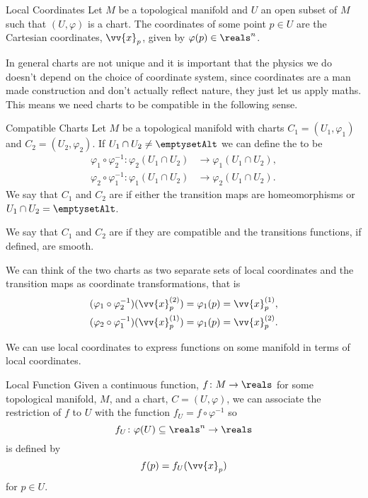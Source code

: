 \begin{dfn}{Local Coordinates}{}
    Let \(M\) be a topological manifold and \(U\) an open subset of \(M\) such that \((U, \varphi)\) is a chart.
    The coordinates of some point \(p \in U\) are the Cartesian coordinates, \(\vv{x}_p\), given by \(\varphi(p) \in \reals^n\).
\end{dfn}

In general charts are not unique and it is important that the physics we do doesn't depend on the choice of coordinate system, since coordinates are a man made construction and don't actually reflect nature, they just let us apply maths.
This means we need charts to be compatible in the following sense.

\begin{dfn}{Compatible Charts}{}
    Let \(M\) be a topological manifold with charts \(C_1 = (U_1, \varphi_1)\) and \(C_2 = (U_2, \varphi_2)\).
    If \(U_1 \cap U_2 \ne \emptysetAlt\) we can define the  to be
    \begin{align}
        \varphi_1 \circ \varphi_2^{-1} \colon \varphi_2(U_1 \cap U_2) &\to \varphi_1(U_1 \cap U_2),\\
        \varphi_2 \circ \varphi_1^{-1} \colon \varphi_1(U_1 \cap U_2) &\to \varphi_2(U_1 \cap U_2).
    \end{align}
    We say that \(C_1\) and \(C_2\) are  if either the transition maps are homeomorphisms or \(U_1 \cap U_2 = \emptysetAlt\).
    
    We say that \(C_1\) and \(C_2\) are  if they are compatible and the transitions functions, if defined, are smooth.
\end{dfn}

We can think of the two charts as two separate sets of local coordinates and the transition maps as coordinate transformations, that is
\begin{align}
    (\varphi_1 \circ \varphi_2^{-1})(\vv{x}_p^{(2)}) &= \varphi_1(p) = \vv{x}_p^{(1)},\\
    (\varphi_2 \circ \varphi_1^{-1})(\vv{x}_p^{(1)}) &= \varphi_1(p) = \vv{x}_p^{(2)}.
\end{align}

We can use local coordinates to express functions on some manifold in terms of local coordinates.

\begin{dfn}{Local Function}{}
    Given a continuous function, \(f \colon M \to \reals\) for some topological manifold, \(M\), and a chart, \(C = (U, \varphi)\), we can associate the restriction of \(f\) to \(U\) with the function \(f_U = f \circ \varphi^{-1}\) so
    \begin{equation}
        f_U \colon \varphi(U) \subseteq \reals^n \to \reals
    \end{equation}
    is defined by
    \begin{equation}
        f(p) = f_U(\vv{x}_p)
    \end{equation}
    for \(p \in U\).
\end{dfn}

